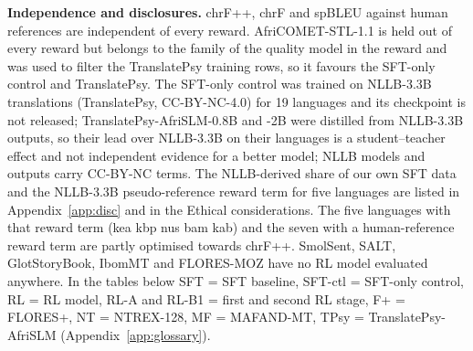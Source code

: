 \textbf{Independence and disclosures.} chrF++, chrF and spBLEU against human references are independent of every reward. AfriCOMET-STL-1.1 is held out of every reward but belongs to the family of the quality model in the reward and was used to filter the TranslatePsy training rows, so it favours the SFT-only control and TranslatePsy. The SFT-only control was trained on NLLB-3.3B translations (TranslatePsy, CC-BY-NC-4.0) for 19 languages and its checkpoint is not released; TranslatePsy-AfriSLM-0.8B and -2B were distilled from NLLB-3.3B outputs, so their lead over NLLB-3.3B on their languages is a student--teacher effect and not independent evidence for a better model; NLLB models and outputs carry CC-BY-NC terms. The NLLB-derived share of our own SFT data and the NLLB-3.3B pseudo-reference reward term for five languages are listed in Appendix~\ref{app:disc} and in the Ethical considerations. The five languages with that reward term (kea kbp nus bam kab) and the seven with a human-reference reward term are partly optimised towards chrF++. SmolSent, SALT, GlotStoryBook, IbomMT and FLORES-MOZ have no RL model evaluated anywhere. In the tables below SFT = SFT baseline, SFT-ctl = SFT-only control, RL = RL model, RL-A and RL-B1 = first and second RL stage, F+ = FLORES+, NT = NTREX-128, MF = MAFAND-MT, TPsy = TranslatePsy-AfriSLM (Appendix~\ref{app:glossary}).

